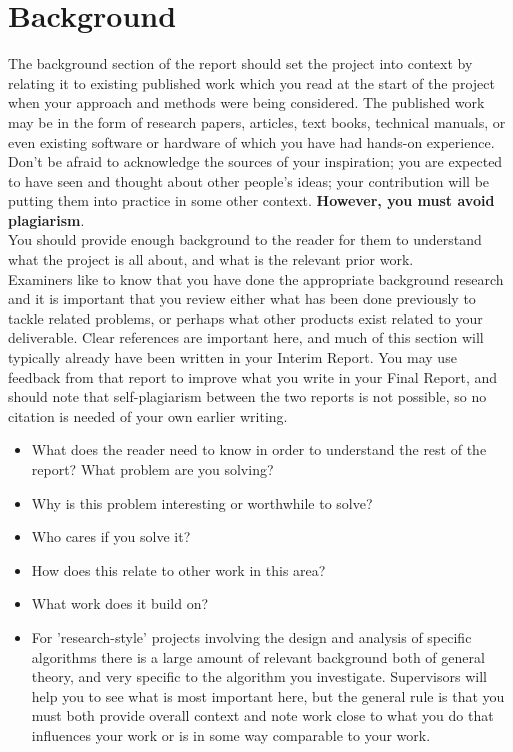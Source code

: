 \section{Background}
The background section of the
report should set the project into context by
relating it to existing published work which you
read at the start of the project when your
approach and methods were being considered.
The published work may be in the form of
research papers, articles, text books, technical
manuals, or even existing software or hardware
of which you have had hands-on experience.
Don't be afraid to acknowledge the sources of
your inspiration; you are expected to have seen
and thought about other people's ideas; your
contribution will be putting them into practice in
some other context. \textbf{However, you must avoid
plagiarism}. \\ \newline \noindent You should provide enough background to the reader
for them to understand what the project is all about,
and what is the relevant prior work.\\ \newline \noindent Examiners like to know that you have done the
appropriate background research and it is important
that you review either what has been done previously
to tackle related problems, or perhaps what other
products exist related to your deliverable. Clear
references are important here, and much of this
section will typically already have been written in your
Interim Report. You may use feedback from that
report to improve what you write in your Final Report,
and should note that self-plagiarism between the two
reports is not possible, so no citation is needed of
your own earlier writing.
\begin{itemize}
    \item What does the reader need to know in order
    to understand the rest of the report? What
    problem are you solving?
    \item Why is this problem interesting or worthwhile
    to solve?
    \item Who cares if you solve it?
    \item How does this relate to other work in this
    area?
    \item What work does it build on?
    \item For 'research-style' projects involving the
    design and analysis of specific algorithms
    there is a large amount of relevant
    background both of general theory, and very
    specific to the algorithm you investigate.
    Supervisors will help you to see what is most
    important here, but the general rule is that
    you must both provide overall context and
    note work close to what you do that
    influences your work or is in some way
    comparable to your work.
\end{itemize}
